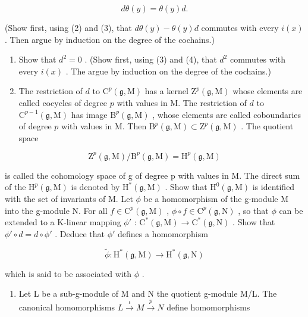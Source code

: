 \[
d \theta (y) = \theta (y) d.\tag{4}
\]

(Show first, using (2) and (3), that \(d\theta(y) - \theta(y)d\) commutes with every \(i(x)\) . Then argue by induction on the degree of the cochains.)

\begin{enumerate}
\def\labelenumi{(\alph{enumi})}
\setcounter{enumi}{3}
\item
  Show that \(d^2 = 0\) . (Show first, using (3) and (4), that \(d^2\) commutes with every \(i(x)\) . The argue by induction on the degree of the cochains.)
\item
  The restriction of \(d\) to \(\mathrm{C}^p (\mathfrak{g},\mathrm{M})\) has a kernel \(\mathrm{Z}^p (\mathfrak{g},\mathrm{M})\) whose elements are called cocycles of degree \(p\) with values in M. The restriction of \(d\) to \(\mathrm{C}^{p - 1}(\mathfrak{g},\mathrm{M})\) has image \(\mathrm{B}^p (\mathfrak{g},\mathrm{M})\) , whose elements are called coboundaries of degree \(p\) with values in M. Then \(\mathrm{B}^p (\mathfrak{g},\mathrm{M})\subset \mathrm{Z}^p (\mathfrak{g},\mathrm{M})\) . The quotient space
\end{enumerate}

\[
\mathrm{Z} ^ {p} (\mathfrak {g}, \mathrm{M}) / \mathrm{B} ^ {p} (\mathfrak {g}, \mathrm{M}) = \mathrm{H} ^ {p} (\mathfrak {g}, \mathrm{M})
\]

 is called the cohomology space of g of degree p with values in M. The direct sum of the \(\mathrm{H}^{p}(\mathfrak{g},\mathrm{M})\) is denoted by \(\mathrm{H}^{*}(\mathfrak{g},\mathrm{M})\) . Show that \(\mathrm{H}^{0}(\mathfrak{g},\mathrm{M})\) is identified with the set of invariants of M. Let \(\phi\) be a homomorphism of the g-module M into the g-module N. For all \(f \in \mathrm{C}^{p}(\mathfrak{g},\mathrm{M})\) , \(\phi \circ f \in \mathrm{C}^{p}(\mathfrak{g},\mathrm{N})\) , so that \(\phi\) can be extended to a K-linear mapping \(\phi'\) : \(\mathrm{C}^{*}(\mathfrak{g},\mathrm{M}) \to \mathrm{C}^{*}(\mathfrak{g},\mathrm{N})\) . Show that \(\phi' \circ d = d \circ \phi'\) . Deduce that \(\phi'\) defines a homomorphism

\[
\tilde {\phi} \colon \mathrm{H} ^ {*} (\mathfrak {g}, \mathrm{M}) \to \mathrm{H} ^ {*} (\mathfrak {g}, \mathrm{N})
\]

which is said to be associated with \(\phi\) .

\begin{enumerate}
\def\labelenumi{(\alph{enumi})}
\setcounter{enumi}{5}
\tightlist
\item
  Let L be a sub-g-module of M and N the quotient g-module M/L. The canonical homomorphisms \(L \stackrel{\iota}{\rightarrow} M \stackrel{p}{\rightarrow} N\) define homomorphisms
\end{enumerate}

